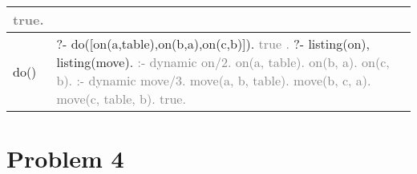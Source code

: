 \documentclass{article}
\begin{document}
\begin{tabular}{|p{6cm}|p{6cm}|}
                    \newline \textcolor{gray}{    true.}\\
                \hline
                    do() & ?- do([on(a,table),on(b,a),on(c,b)]).
                    \newline \textcolor{gray}{    true .}
                    \newline ?- listing(on), listing(move).
                    \newline \textcolor{gray}{:- dynamic on/2.}
                    \newline \textcolor{gray}{    on(a, table).}
                    \newline \textcolor{gray}{    on(b, a).}
                    \newline \textcolor{gray}{    on(c, b).}
                    \newline \textcolor{gray}{:- dynamic move/3.}
                    \newline \textcolor{gray}{    move(a, b, table).}
                    \newline \textcolor{gray}{    move(b, c, a).}
                    \newline \textcolor{gray}{    move(c, table, b).}
                    \newline \textcolor{gray}{    true.}\\
                \hline
            \end{tabular}

    \section{Problem 4}
\end{document}
